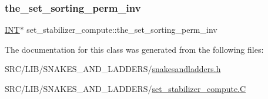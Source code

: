 \subsubsection{\texorpdfstring{the\+\_\+set\+\_\+sorting\+\_\+perm\+\_\+inv}{the\_set\_sorting\_perm\_inv}}
{\footnotesize\ttfamily \mbox{\hyperlink{galois_8h_a09fddde158a3a20bd2dcadb609de11dc}{I\+NT}}$\ast$ set\+\_\+stabilizer\+\_\+compute\+::the\+\_\+set\+\_\+sorting\+\_\+perm\+\_\+inv}



The documentation for this class was generated from the following files\+:\begin{DoxyCompactItemize}
\item 
S\+R\+C/\+L\+I\+B/\+S\+N\+A\+K\+E\+S\+\_\+\+A\+N\+D\+\_\+\+L\+A\+D\+D\+E\+R\+S/\mbox{\hyperlink{snakesandladders_8h}{snakesandladders.\+h}}\item 
S\+R\+C/\+L\+I\+B/\+S\+N\+A\+K\+E\+S\+\_\+\+A\+N\+D\+\_\+\+L\+A\+D\+D\+E\+R\+S/\mbox{\hyperlink{set__stabilizer__compute_8_c}{set\+\_\+stabilizer\+\_\+compute.\+C}}\end{DoxyCompactItemize}
